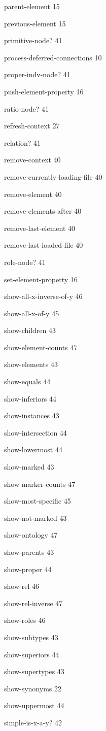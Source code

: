 \documentclass[titlepage,twoside,openright,11pt]{article}
\begin{document}
parent-element 15

previous-element 15

primitive-node? 41

process-deferred-connections 10

proper-indv-node? 41

push-element-property 16

ratio-node? 41

refresh-context 27

relation? 41

remove-context 40

remove-currently-loading-file 40

remove-element 40

remove-elements-after 40

remove-last-element 40

remove-last-loaded-file 40

role-node? 41

set-element-property 16

show-all-x-inverse-of-y 46

show-all-x-of-y 45

show-children 43

show-element-counts 47

show-elements 43

show-equals 44

show-inferiors 44

show-instances 43

show-intersection 44

show-lowermost 44

show-marked 43

show-marker-counts 47

show-most-specific 45

show-not-marked 43

show-ontology 47

show-parents 43

show-proper 44

show-rel 46

show-rel-inverse 47

show-roles 46

show-subtypes 43

show-superiors 44

show-supertypes 43

show-synonyms 22

show-uppermost 44

simple-is-x-a-y? 42
\end{document}
